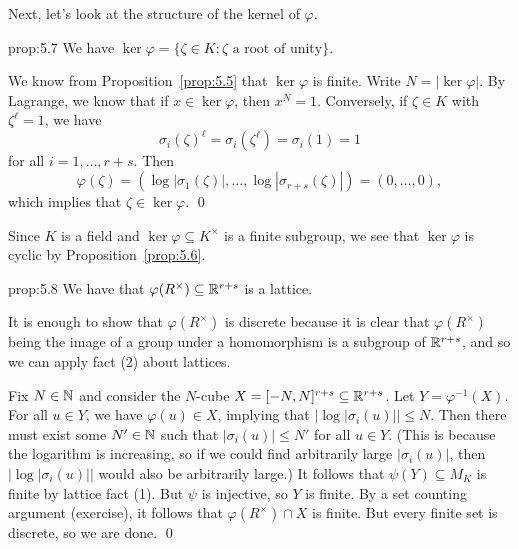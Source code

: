 Next, let's look at the structure of the kernel of $\varphi$. 

\begin{prop}{prop:5.7}
    We have $\ker\varphi = \{\zeta \in K : \zeta \text{ a root of unity}\}$.
\end{prop}\vspace{-0.25cm}
\begin{pf}
    We know from Proposition~\ref{prop:5.5} that $\ker\varphi$ is finite. Write 
    $N = \lvert\ker\varphi\rvert$. By Lagrange, we know that if $x \in \ker\varphi$, 
    then $x^N = 1$. Conversely, if $\zeta \in K$ with $\zeta^\ell = 1$, we have 
    \[ \sigma_i(\zeta)^\ell = \sigma_i(\zeta^\ell) = \sigma_i(1) = 1 \] 
    for all $i = 1, \dots, r+s$. Then 
    \[ \varphi(\zeta) = (\log |\sigma_1(\zeta)|, \dots, \log|\sigma_{r+s}(\zeta)|) = (0, \dots, 0), \]
    which implies that $\zeta \in \ker\varphi$. \qed 
\end{pf}\vspace{-0.25cm}

Since $K$ is a field and $\ker\varphi \subseteq K^\times$ is a finite subgroup, 
we see that $\ker\varphi$ is cyclic by Proposition~\ref{prop:5.6}.

\begin{prop}{prop:5.8}
    We have that $\varphi(R^\times) \subseteq \mathbb{R}^{r+s}$ is a lattice.
\end{prop}\vspace{-0.25cm}\newpage
\begin{pf}
    It is enough to show that $\varphi(R^\times)$ is discrete because it is 
    clear that $\varphi(R^\times)$ being the image of a group under a 
    homomorphism is a subgroup of $\mathbb{R}^{r+s}$, and so we can apply fact (2)
    about lattices.

    Fix $N \in \mathbb{N}$ and consider the $N$-cube $X = [-N, N]^{r+s} \subseteq \mathbb{R}^{r+s}$. 
    Let $Y = \varphi^{-1}(X)$. For all $u \in Y$, we have $\varphi(u) \in X$, 
    implying that $\lvert\log|\sigma_i(u)|\rvert \leq N$. Then there must exist 
    some $N' \in \mathbb{N}$ such that $|\sigma_i(u)| \leq N'$ for all $u \in Y$.
    (This is because the logarithm is increasing, so if we could find arbitrarily 
    large $|\sigma_i(u)|$, then $\lvert\log |\sigma_i(u)|\rvert$ would also be 
    arbitrarily large.) It follows that $\psi(Y) \subseteq M_K$ is finite by 
    lattice fact (1). But $\psi$ is injective, so $Y$ is finite. 
    By a set counting argument (exercise), it follows that $\varphi(R^\times) \cap X$ 
    is finite. But every finite set is discrete, so we are done. \qed 
\end{pf}\vspace{-0.25cm}

